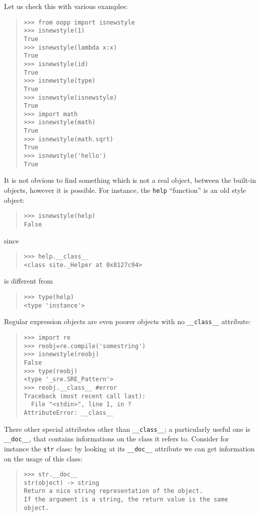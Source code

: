 \documentclass[10pt,english]{article}
\begin{document}
Let us check this with various examples:
\begin{quote}
\begin{verbatim}>>> from oopp import isnewstyle
>>> isnewstyle(1)
True
>>> isnewstyle(lambda x:x)
True
>>> isnewstyle(id)
True
>>> isnewstyle(type)
True
>>> isnewstyle(isnewstyle)
True
>>> import math
>>> isnewstyle(math)
True
>>> isnewstyle(math.sqrt)
True
>>> isnewstyle('hello')
True\end{verbatim}
\end{quote}

It is not obvious to find something which is not a real object,
between the built-in objects, however it is possible. For instance, 
the \texttt{help} ``function'' is an old style object:
\begin{quote}
\begin{verbatim}>>> isnewstyle(help)
False\end{verbatim}
\end{quote}

since
\begin{quote}
\begin{verbatim}>>> help.__class__
<class site._Helper at 0x8127c94>\end{verbatim}
\end{quote}

is different from
\begin{quote}
\begin{verbatim}>>> type(help)
<type 'instance'>\end{verbatim}
\end{quote}

Regular expression objects are even poorer objects with no \texttt{{\_}{\_}class{\_}{\_}} 
attribute:
\begin{quote}
\begin{verbatim}>>> import re
>>> reobj=re.compile('somestring')
>>> isnewstyle(reobj)
False
>>> type(reobj)
<type '_sre.SRE_Pattern'>
>>> reobj.__class__ #error
Traceback (most recent call last):
  File "<stdin>", line 1, in ?
AttributeError: __class__\end{verbatim}
\end{quote}

There other special attributes other than \texttt{{\_}{\_}class{\_}{\_}}; a particularly useful
one is \texttt{{\_}{\_}doc{\_}{\_}}, that contains informations on the class it
refers to. Consider for instance the \texttt{str} class: by looking at its
\texttt{{\_}{\_}doc{\_}{\_}} attribute we can get information on the usage of this class:
\begin{quote}
\begin{verbatim}>>> str.__doc__
str(object) -> string
Return a nice string representation of the object.
If the argument is a string, the return value is the same object.\end{verbatim}
\end{quote}
\end{document}
